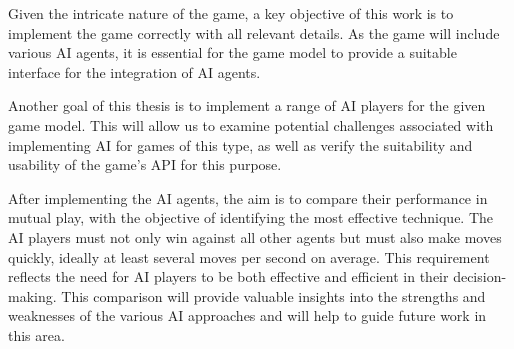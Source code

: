 Given the intricate nature of the game, a key objective of this work is to implement the game correctly with all relevant details. As the game will include various AI agents, it is essential for the game model to provide a suitable interface for the integration of AI agents. 

Another goal of this thesis is to implement a range of AI players for the given game model. This will allow us to examine potential challenges associated with implementing AI for games of this type, as well as verify the suitability and usability of the game's API for this purpose.

After implementing the AI agents, the aim is to compare their performance in mutual play, with the objective of identifying the most effective technique. The AI players must not only win against all other agents but must also make moves quickly, ideally at least several moves per second on average. This requirement reflects the need for AI players to be both effective and efficient in their decision-making. This comparison will provide valuable insights into the strengths and weaknesses of the various AI approaches and will help to guide future work in this area. 
